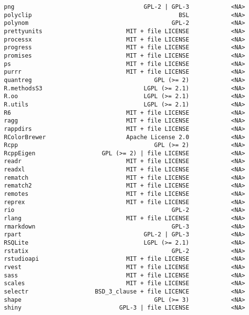 \documentclass[
  letterpaper,
  DIV=11,
  numbers=noendperiod]{scrreprt}
\begin{document}
\begin{verbatim}
png                                     GPL-2 | GPL-3            <NA>
polyclip                                          BSL            <NA>
polynom                                         GPL-2            <NA>
prettyunits                        MIT + file LICENSE            <NA>
processx                           MIT + file LICENSE            <NA>
progress                           MIT + file LICENSE            <NA>
promises                           MIT + file LICENSE            <NA>
ps                                 MIT + file LICENSE            <NA>
purrr                              MIT + file LICENSE            <NA>
quantreg                                   GPL (>= 2)            <NA>
R.methodsS3                             LGPL (>= 2.1)            <NA>
R.oo                                    LGPL (>= 2.1)            <NA>
R.utils                                 LGPL (>= 2.1)            <NA>
R6                                 MIT + file LICENSE            <NA>
ragg                               MIT + file LICENSE            <NA>
rappdirs                           MIT + file LICENSE            <NA>
RColorBrewer                       Apache License 2.0            <NA>
Rcpp                                       GPL (>= 2)            <NA>
RcppEigen                   GPL (>= 2) | file LICENSE            <NA>
readr                              MIT + file LICENSE            <NA>
readxl                             MIT + file LICENSE            <NA>
rematch                            MIT + file LICENSE            <NA>
rematch2                           MIT + file LICENSE            <NA>
remotes                            MIT + file LICENSE            <NA>
reprex                             MIT + file LICENSE            <NA>
rio                                             GPL-2            <NA>
rlang                              MIT + file LICENSE            <NA>
rmarkdown                                       GPL-3            <NA>
rpart                                   GPL-2 | GPL-3            <NA>
RSQLite                                 LGPL (>= 2.1)            <NA>
rstatix                                         GPL-2            <NA>
rstudioapi                         MIT + file LICENSE            <NA>
rvest                              MIT + file LICENSE            <NA>
sass                               MIT + file LICENSE            <NA>
scales                             MIT + file LICENSE            <NA>
selectr                   BSD_3_clause + file LICENCE            <NA>
shape                                      GPL (>= 3)            <NA>
shiny                            GPL-3 | file LICENSE            <NA>

\end{verbatim}
\end{document}
